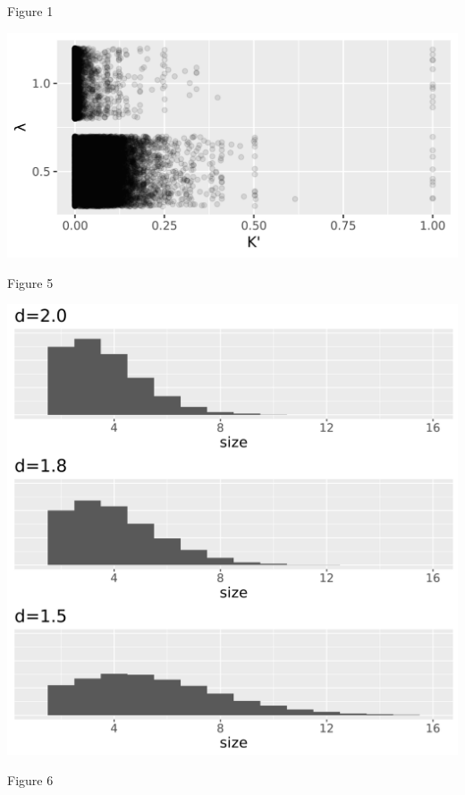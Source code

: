 Figure 1 \label{fig:sim_distribution}

\includegraphics[scale=0.5]{sim_distribution.png}

Figure 5 \label{fig:size_dist}

\includegraphics[scale=0.35]{size_distribution.png}

Figure 6 \label{fig:scatter_rsa_prefix}

